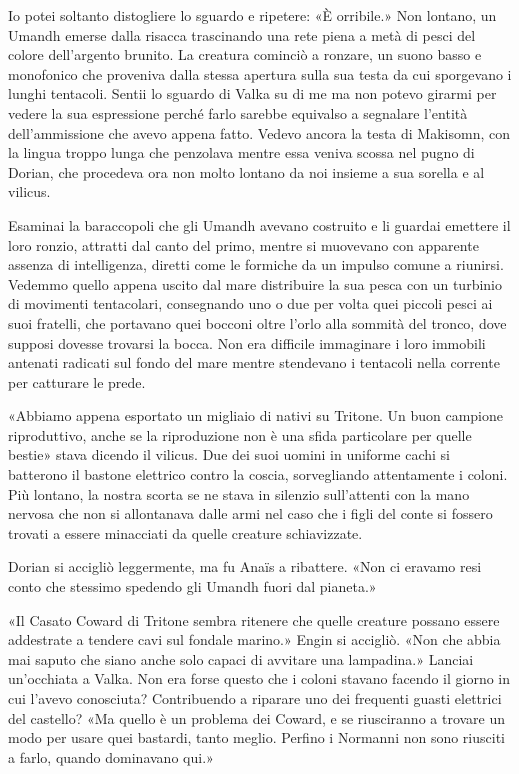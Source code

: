 Io potei soltanto distogliere lo sguardo e ripetere: «È orribile.» Non
lontano, un Umandh emerse dalla risacca trascinando una rete piena a
metà di pesci del colore dell'argento brunito. La creatura cominciò a
ronzare, un suono basso e monofonico che proveniva dalla stessa apertura
sulla sua testa da cui sporgevano i lunghi tentacoli. Sentii lo sguardo
di Valka su di me ma non potevo girarmi per vedere la sua espressione
perché farlo sarebbe equivalso a segnalare l'entità dell'ammissione che
avevo appena fatto. Vedevo ancora la testa di Makisomn, con la lingua
troppo lunga che penzolava mentre essa veniva scossa nel pugno di
Dorian, che procedeva ora non molto lontano da noi insieme a sua sorella
e al vilicus.

Esaminai la baraccopoli che gli Umandh avevano costruito e li guardai
emettere il loro ronzio, attratti dal canto del primo, mentre si
muovevano con apparente assenza di intelligenza, diretti come le
formiche da un impulso comune a riunirsi. Vedemmo quello appena uscito
dal mare distribuire la sua pesca con un turbinio di movimenti
tentacolari, consegnando uno o due per volta quei piccoli pesci ai suoi
fratelli, che portavano quei bocconi oltre l'orlo alla sommità del
tronco, dove supposi dovesse trovarsi la bocca. Non era difficile
immaginare i loro immobili antenati radicati sul fondo del mare mentre
stendevano i tentacoli nella corrente per catturare le prede.

«Abbiamo appena esportato un migliaio di nativi su Tritone. Un buon
campione riproduttivo, anche se la riproduzione non è una sfida
particolare per quelle bestie» stava dicendo il vilicus. Due dei suoi
uomini in uniforme cachi si batterono il bastone elettrico contro la
coscia, sorvegliando attentamente i coloni. Più lontano, la nostra
scorta se ne stava in silenzio sull'attenti con la mano nervosa che non
si allontanava dalle armi nel caso che i figli del conte si fossero
trovati a essere minacciati da quelle creature schiavizzate.

Dorian si accigliò leggermente, ma fu Anaïs a ribattere. «Non ci eravamo
resi conto che stessimo spedendo gli Umandh fuori dal pianeta.»

«Il Casato Coward di Tritone sembra ritenere che quelle creature possano
essere addestrate a tendere cavi sul fondale marino.» Engin si accigliò.
«Non che abbia mai saputo che siano anche solo capaci di avvitare una
lampadina.» Lanciai un'occhiata a Valka. Non era forse questo che i
coloni stavano facendo il giorno in cui l'avevo conosciuta? Contribuendo
a riparare uno dei frequenti guasti elettrici del castello? «Ma quello è
un problema dei Coward, e se riusciranno a trovare un modo per usare
quei bastardi, tanto meglio. Perfino i Normanni non sono riusciti a
farlo, quando dominavano qui.»

